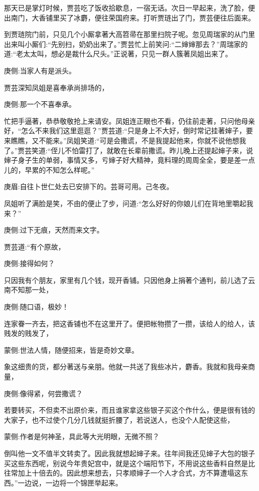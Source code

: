 \begin{parag}
    那天已是掌灯时候，贾芸吃了饭收拾歇息，一宿无话。次日一早起来，洗了脸，便出南门，大香铺里买了冰麝，便往荣国府来。打听贾琏出了门，贾芸便往后面来。
\end{parag}


\begin{parag}
    到贾琏院门前，只见几个小厮拿著大高笤帚在那里扫院子呢。忽见周瑞家的从门里出来叫小厮们:“先别扫，奶奶出来了。”贾芸忙上前笑问:“二婶婶那去？”周瑞家的道:“老太太叫，想必是裁什么尺头。”正说著，只见一群人簇著凤姐出来了。\begin{note}庚侧:当家人有是派头。\end{note}贾芸深知凤姐是喜奉承尚排场的，\begin{note}庚侧:那一个不喜奉承。\end{note}忙把手逼著，恭恭敬敬抢上来请安。凤姐连正眼也不看，仍往前走著，只问他母亲好，“怎么不来我们这里逛逛？”贾芸道:“只是身上不大好，倒时常记挂著婶子，要来瞧瞧，又不能来。”凤姐笑道:“可是会撒谎，不是我提起他来，你就不说他想我了。”贾芸笑道:“侄儿不怕雷打了，就敢在长辈前撒谎。昨儿晚上还提起婶子来，说婶子身子生的单弱，事情又多，亏婶子好大精神，竟料理的周周全全，要是差一点儿的，早累的不知怎么样呢。”\begin{note}庚眉:自往卜世仁处去已安排下的。芸哥可用。己冬夜。\end{note}
\end{parag}


\begin{parag}
    凤姐听了满脸是笑，不由的便止了步，问道:“怎么好好的你娘儿们在背地里嚼起我来？”\begin{note}庚侧:过下无痕，天然而来文字。\end{note}贾芸道:“有个原故，\begin{note}庚侧:接得如何？\end{note}只因我有个朋友，家里有几个钱，现开香铺。只因他身上捐著个通判，前儿选了云南不知那一处，\begin{note}庚侧:随口语，极妙！\end{note}连家眷一齐去，把这香铺也不在这里开了。便把帐物攒了一攒，该给人的给人，该贱发的贱发了，\begin{note}蒙侧:世法人情，随便招来，皆是奇妙文章。\end{note}象这细贵的货，都分著送与亲朋。他就一共送了我些冰片，麝香。我就和我母亲商量，\begin{note}庚侧:像得紧，何尝撒谎？\end{note}若要转买，不但卖不出原价来，而且谁家拿这些银子买这个作什么，便是很有钱的大家子，也不过使个几分几钱就挺折腰了，若说送人，也没个人配使这些，\begin{note}蒙侧:作者是何神圣，具此等大光明眼，无微不照？\end{note}倒叫他一文不值半文转卖了。因此我就想起婶子来。往年间我还见婶子大包的银子买这些东西呢，别说今年贵妃宫中，就是这个端阳节下，不用说这些香料自然是比往常加上十倍去的。因此想来想去，只孝顺婶子一个人才合式，方不算遭塌这东西。”一边说，一边将一个锦匣举起来。
\end{parag}


